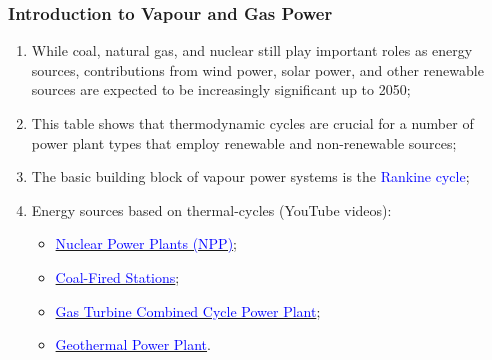 \documentclass[10pt,compress,handout,unknownkeysallowed]{beamer}
\begin{document}
\begin{frame}
 \frametitle{Introduction to Vapour and Gas Power}

    \begin{enumerate}%
     \item <1-> While coal, natural gas, and nuclear still play important roles as energy sources, contributions from wind power, solar power, and other renewable sources are expected to be increasingly significant up to 2050;
     \item <2-> This table shows that thermodynamic cycles are crucial for a number of power plant types that employ renewable and non-renewable sources;
     \item <3-> The basic building block of vapour power systems is the \textcolor{blue}{Rankine cycle};
     \item <4-> Energy sources based on thermal-cycles (YouTube videos):
        \begin{itemize}%
           \item \href{http://www.youtube.com/watch?v=_UwexvaCMWA}{\textcolor{blue}{Nuclear Power Plants (NPP)}};
           \item \href{http://www.youtube.com/watch?v=0mjT8ETB128}{\textcolor{blue}{Coal-Fired Stations}};
           \item \href{http://www.youtube.com/watch?v=oi1TRbiE_Kw}{\textcolor{blue}{Gas Turbine Combined Cycle Power Plant}};
           \item \href{https://www.youtube.com/watch?v=kjpp2MQffnw}{\textcolor{blue}{Geothermal Power Plant}}.
        \end{itemize}
    \end{enumerate}
 \normalsize
\end{frame}
\end{document}
